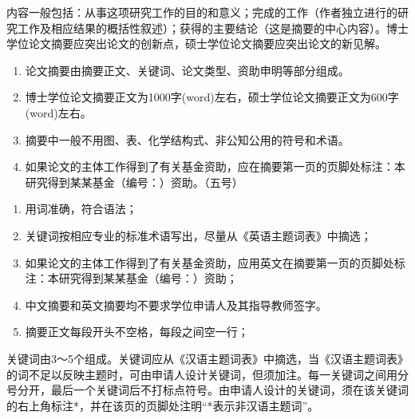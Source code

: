 


\begin{tcolorbox}[colback=blue!5!white,colframe=blue!75!black,title=摘要内容要求]
  内容一般包括：从事这项研究工作的目的和意义；完成的工作（作者独立进行的研究工作及相应结果的概括性叙述）；获得的主要结论（这是摘要的中心内容）。博士学位论文摘要应突出论文的创新点，硕士学位论文摘要应突出论文的新见解。
\end{tcolorbox}

\begin{tcolorbox}[colback=red!5!white,colframe=red!75!black,title=中文摘要主体格式]
  \begin{enumerate}[leftmargin=0.5cm]
    \item 论文摘要由摘要正文、关键词、论文类型、资助申明等部分组成。
    \item 博士学位论文摘要正文为1000字(word)左右，硕士学位论文摘要正文为600字(word)左右。
    \item 摘要中一般不用图、表、化学结构式、非公知公用的符号和术语。
    \item 如果论文的主体工作得到了有关基金资助，应在摘要第一页的页脚处标注：本研究得到某某基金（编号：）资助。（五号）
  \end{enumerate}
\end{tcolorbox}

\begin{tcolorbox}[colback=red!5!white,colframe=red!75!black,title=英文摘要主体格式]
  \begin{enumerate}[leftmargin=0.5cm]
    \item 用词准确，符合语法；
    \item 关键词按相应专业的标准术语写出，尽量从《英语主题词表》中摘选；
    \item 如果论文的主体工作得到了有关基金资助，应用英文在摘要第一页的页脚处标注：本研究得到某某基金（编号：）资助；
    \item 中文摘要和英文摘要均不要求学位申请人及其指导教师签字。
    \item 摘要正文每段开头不空格，每段之间空一行；
  \end{enumerate}
\end{tcolorbox}

\begin{tcolorbox}[colback=blue!5!white,colframe=blue!75!black,title=关键词要求]
  关键词由3～5个组成。关键词应从《汉语主题词表》中摘选，当《汉语主题词表》的词不足以反映主题时，可由申请人设计关键词，但须加注。每一关键词之间用分号分开，最后一个关键词后不打标点符号。由申请人设计的关键词，须在该关键词的右上角标注*，并在该页的页脚处注明“*表示非汉语主题词”。
\end{tcolorbox}


